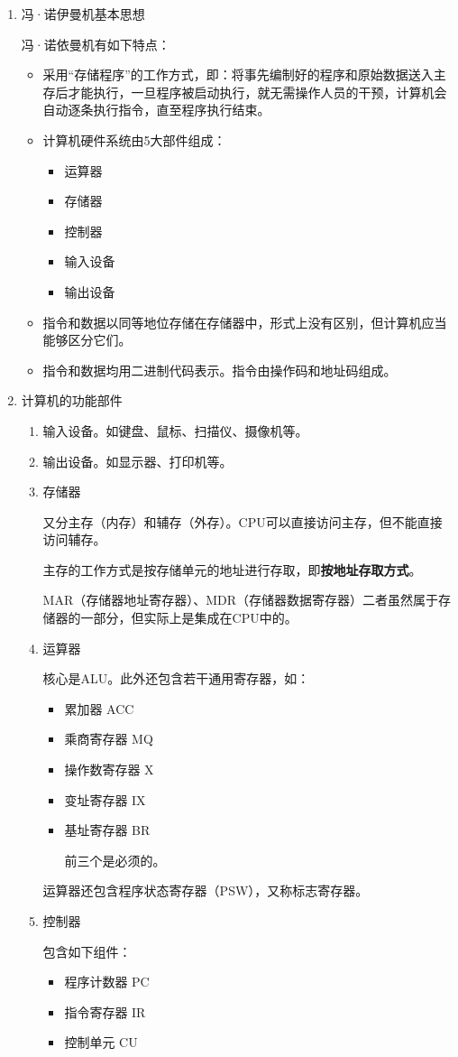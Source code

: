 \documentclass[12pt, a4paper, oneside]{ctexart}
\begin{document}
\begin{enumerate}
  \item {\kaishu 冯·诺伊曼机基本思想}
  
  冯·诺依曼机有如下特点：
  \begin{itemize}
    \item 采用“存储程序”的工作方式，即：将事先编制好的程序和原始数据送入主存后才能执行，一旦程序被启动执行，就无需操作人员的干预，计算机会自动逐条执行指令，直至程序执行结束。
    \item 计算机硬件系统由5大部件组成：
    \begin{itemize}
      \item 运算器
      \item 存储器
      \item 控制器
      \item 输入设备
      \item 输出设备
    \end{itemize}
    \item 指令和数据以同等地位存储在存储器中，形式上没有区别，但计算机应当能够区分它们。
    \item 指令和数据均用二进制代码表示。指令由操作码和地址码组成。
  \end{itemize}
  \item {\kaishu 计算机的功能部件}
  \begin{enumerate}
    \item {\kaishu 输入设备}。如键盘、鼠标、扫描仪、摄像机等。
    \item {\kaishu 输出设备}。如显示器、打印机等。
    \item {\kaishu 存储器}
    
    又分主存（内存）和辅存（外存）。CPU可以直接访问主存，但不能直接访问辅存。
    
    主存的工作方式是按存储单元的地址进行存取，即\textbf{按地址存取方式}。

    MAR（存储器地址寄存器）、MDR（存储器数据寄存器）二者虽然属于存储器的一部分，但实际上是集成在CPU中的。
    \item {\kaishu 运算器}
    
    核心是ALU。此外还包含若干通用寄存器，如：
    \begin{itemize}
      \item 累加器 ACC
      \item 乘商寄存器 MQ
      \item 操作数寄存器 X
      \item 变址寄存器 IX
      \item 基址寄存器 BR
      
      前三个是必须的。
    \end{itemize}
    运算器还包含程序状态寄存器（PSW），又称标志寄存器。
    \item {\kaishu 控制器}
    
    包含如下组件：
    \begin{itemize}
      \item 程序计数器 PC
      \item 指令寄存器 IR
      \item 控制单元 CU
    \end{itemize}
  \end{enumerate}
\end{enumerate}
\end{document}
